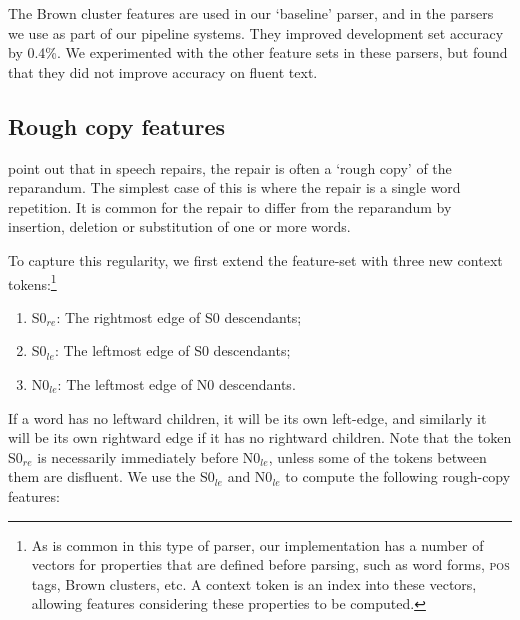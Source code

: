\documentclass[11pt,letterpaper]{article}
\newcommand{\szero}{S0\xspace}
\newcommand{\nzero}{N0\xspace}
\newcommand{\szeroRedge}{S0$_{re}$\xspace}
\newcommand{\szeroLedge}{S0$_{le}$\xspace}
\newcommand{\nzeroLedge}{N0$_{le}$\xspace}
\begin{document}
The Brown cluster features are used in our `baseline' parser, and in the parsers
we use as part of our pipeline systems. They improved development set accuracy
by 0.4\%.  We experimented with the other feature sets in these parsers, but found
that they did not improve accuracy on fluent text.

\subsection{Rough copy features}

\citet{Johnson04a} point out that in speech repairs, the repair is often a `rough
copy' of the reparandum.  The simplest case of this is where the repair is a single
word repetition.
It is common for the repair to differ from the reparandum by insertion, deletion
or substitution of one or more words.

To capture this regularity, we first extend the feature-set with three new
context tokens:\footnote{As is common
in this type of parser, our implementation has a number of vectors for properties
that are defined before parsing, such as word forms, \textsc{pos} tags, Brown
clusters, etc. A context token is an index into these vectors, allowing
features considering these properties to be computed.}
\begin{enumerate}
    \itemsep0em
    \item \szeroRedge : The rightmost edge of \szero  descendants;
    \item \szeroLedge : The leftmost edge of \szero  descendants;
    \item \nzeroLedge : The leftmost edge of \nzero  descendants.
\end{enumerate}

If a word has
no leftward children, it will be its own left-edge, and similarly it will be
its own rightward edge if it has no rightward children. Note that the token
\szeroRedge is necessarily immediately before \nzeroLedge, unless some of the
tokens between them are disfluent.
We use the \szeroLedge and \nzeroLedge to compute the following rough-copy
features:

\end{document}
